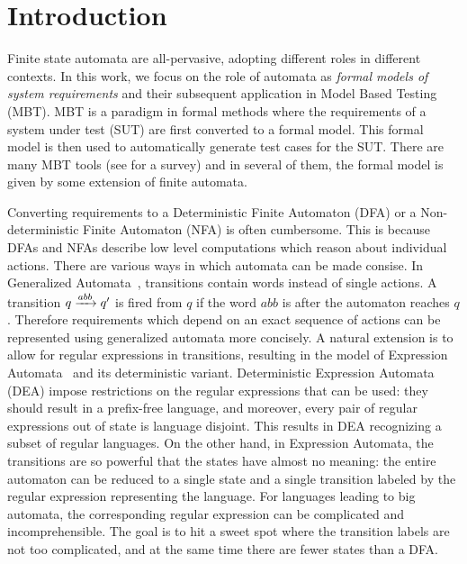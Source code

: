 \section{Introduction}
\label{sec:intro}


  Finite state automata are all-pervasive, adopting different roles in different contexts. In this work, we focus on the role of automata as \emph{formal models of system requirements} and their subsequent application in Model Based Testing (MBT). MBT is a paradigm in formal methods where the requirements of a system under test (SUT) are first converted to a formal model. This formal model is then used to automatically generate test cases for the SUT. There are many MBT tools (see \cite{10.1145/1353673.1353681,10.1002/stvr.456} for a survey) and in several of them, the formal model is given by some extension of finite automata. 


  Converting requirements to a Deterministic Finite Automaton (DFA) or a Non-deterministic Finite Automaton (NFA) is often cumbersome. This is because DFAs and NFAs describe low level computations which reason about individual actions. There are various ways in which automata can be made consise. In Generalized Automata~\cite{DBLP:books/lib/Eilenberg76,GIAMMARRESI1999191}, transitions contain words instead of single actions. A transition $q \xrightarrow{abb} q'$ is fired from $q$ if the word $abb$ is after the automaton reaches $q$. Therefore requirements which depend on an exact sequence of actions can be represented using generalized automata more concisely. A natural extension is to allow for regular expressions in transitions, resulting in the model of Expression Automata~\cite{10.1007/978-3-540-30500-2_15} and its deterministic variant. Deterministic Expression Automata (DEA) impose restrictions on the regular expressions that can be used: they should result in a prefix-free language, and moreover, every pair of regular expressions out of state is language disjoint. This results in DEA recognizing a subset of regular languages. On the other hand, in Expression Automata, the transitions are so powerful that the states have almost no meaning: the entire automaton can be reduced to a single state and a single transition labeled by the regular expression representing the language. For languages leading to big automata, the corresponding regular expression can be complicated and incomprehensible. The goal is to hit a sweet spot where the transition labels are not too complicated, and at the same time there are fewer states than a DFA. 


